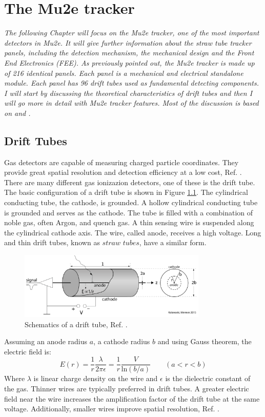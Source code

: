 \chapter{The Mu2e tracker}\label{chaptertrk}

\textit{The following Chapter will focus on the Mu2e tracker, one of the most important detectors in Mu2e. 
It will give further information about the straw tube tracker panels, 
including the detection mechanism, the mechanical design and the Front End Electronics (FEE).
As previously pointed out, the Mu2e tracker is made up of 216 identical panels. 
Each panel is a mechanical and electrical standalone module. Each panel has 96 drift 
tubes used as fundamental detecting components. I will start by discussing the 
theoretical characteristics of drift tubes and then I will go more in detail with Mu2e tracker features. 
Most of the discussion is based on \cite{kola} and \cite{bobbb}.}

\section{Drift Tubes}
Gas detectors are capable of measuring charged particle coordinates. 
They provide great spatial resolution and detection efficiency at a low cost, Ref. \cite{kola}. 
There are many different gas ionizazion detectors, one of these is the drift tube.
The basic configuration of a drift tube is shown in Figure \ref{fig:drifttube}.
The cylindrical conducting tube, the cathode, is grounded.
A hollow cylindrical conducting tube is grounded and serves as the cathode.
The tube is filled with a combination of noble gas, often Argon, and quench gas. 
A thin sensing wire is suspended along the cylindrical cathode axis. 
The wire, called anode, receives a high voltage. Long and thin drift tubes, known as $straw$ $tubes$, have a similar form.
\begin{figure}[!h]
    \centering
    \includegraphics[width =0.8\textwidth]{figures/png/Screenshot_20240324_232621.png}
    \caption{Schematics of a drift tube, Ref. \cite{kola}.}
    \label{fig:drifttube}
    \end{figure}
Assuming an anode radius $a$, a cathode radius $b$ and using Gauss theorem, the electric field is:
\begin{equation}\label{avalanche}
    E(r)=\frac{1}{r}\frac{\lambda}{2\pi \epsilon}=\frac{1}{r}\frac{V}{ \text{ln}(b/a)} \qquad (a<r<b)
\end{equation}
Where $\lambda$ is linear charge density on the wire and $\epsilon$ is the dielectric constant of the gas.
Thinner wires are typically preferred in drift tubes. A greater electric field near the wire increases the amplification factor 
of the drift tube at the same voltage. Additionally, smaller wires improve spatial resolution, Ref. \cite{kola}. 

